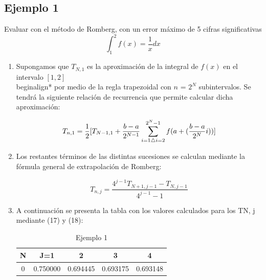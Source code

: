 \documentclass[journal,transmag]{IEEEtran}
\theoremstyle{mytheoremstyle}
\theoremstyle{mytheoremstyle}
\theoremstyle{myproblemstyle}
\begin{document}
    \subsection{Ejemplo 1}
    Evaluar con el método de Romberg, con un error máximo de 5 cifras significativas
    \begin{equation} 
        \int_1^2 f(x)=\frac{1}{x} dx
    \end{equation}
    \begin{enumerate}
    \item Supongamos que $T_{N,1}$ es la aproximación de la integral de $f(x)$ en el intervalo $[1,2]$ \\begin{align*}
        por medio de la regla trapezoidal con $n$ = $2^N$ subintervalos. Se tendrá la siguiente relación de recurrencia
        que permite calcular dicha aproximación: \\
        \begin{center}
            \begin{equation} \footnotesize
                T_{n,1} = \frac{1}{2}[T_{N-1,1} + \frac{{b-a}}{2^{N-1}}\displaystyle\sum_{{i=1 {\triangle i=2}}}^{{2^N-1}} f(a+(\frac{b-a}{2^N}i))]
            \end{equation}
        \end{center}
    \item  Los restantes términos de las distintas sucesiones se calculan mediante la fórmula
    general de extrapolación de Romberg: \\ 
    \begin{center}
        \begin{equation}
            T_{n,j} = \frac{4^{j-1}T_{N+1,j-1}-T_{N,j-1}}{4^{j-1}-1}
        \end{equation}
    \end{center}
    \item   A continuación se presenta la tabla con los valores calculados para los TN, j
    mediante (17) y (18): \\
    \begin{center}
        \begin{table}[h]
            \begin{center}
                \caption{Ejemplo 1}
                \begin{tabular}{| c | c | c | c | c |}
                    \hline
                N & J=1 & 2 & 3 & 4 \\ \hline
                0 & 0.750000 & 0.694445 & 0.693175  & 0.693148\\ \hline

\end{tabular}
\end{center}
\end{table}
\end{center}
\end{enumerate}
\end{document}

